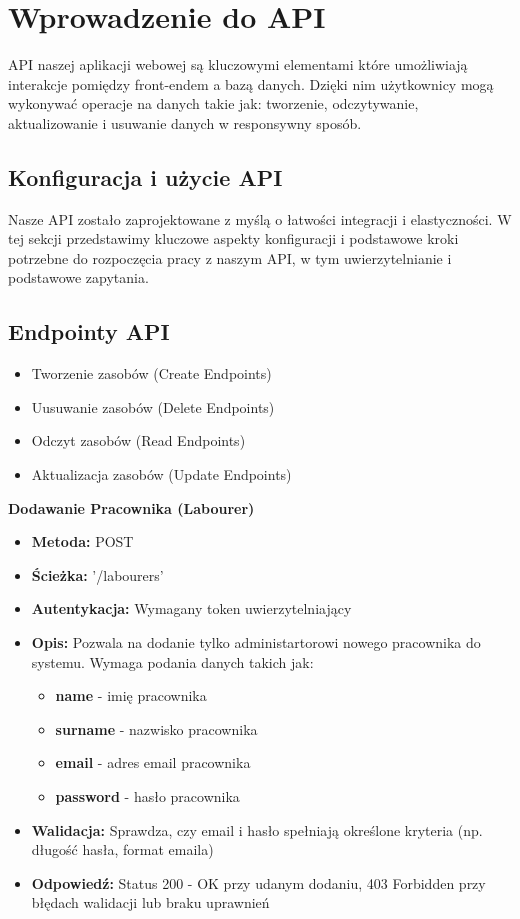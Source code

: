 \section{Wprowadzenie do API}
\noindent API naszej aplikacji webowej są kluczowymi elementami
które umożliwiają interakcje pomiędzy front-endem a bazą danych. Dzięki nim
użytkownicy mogą wykonywać operacje na danych
takie jak: tworzenie, odczytywanie, aktualizowanie i usuwanie danych w responsywny sposób.


\subsection{Konfiguracja i użycie API}
\noindent Nasze API zostało zaprojektowane z myślą o łatwości integracji i elastyczności. W tej sekcji przedstawimy kluczowe aspekty konfiguracji i podstawowe kroki potrzebne 
do rozpoczęcia pracy z naszym API, w tym uwierzytelnianie i podstawowe zapytania.

\subsection{Endpointy API}
\begin{itemize}
    \item Tworzenie zasobów (Create Endpoints)
    \item Uusuwanie zasobów (Delete Endpoints)
    \item Odczyt zasobów (Read Endpoints)
    \item Aktualizacja zasobów (Update Endpoints)
\end{itemize}

\textbf{\large{Dodawanie Pracownika (Labourer)}}
\begin{itemize}
    \item \textbf{Metoda:} POST
    \item \textbf{Ścieżka:} '/labourers'
    \item \textbf{Autentykacja:} Wymagany token uwierzytelniający
    \item \textbf{Opis:} Pozwala na dodanie tylko administartorowi nowego pracownika do systemu. Wymaga podania danych takich jak:
        \begin{itemize}
        \item \textbf{name} - imię pracownika
        \item \textbf{surname} - nazwisko pracownika
        \item \textbf{email} - adres email pracownika
        \item \textbf{password} - hasło pracownika
        \end{itemize}
    \item \textbf{Walidacja:} Sprawdza, czy email i hasło spełniają określone kryteria (np. długość hasła, format emaila)
    \item \textbf{Odpowiedź:} Status 200 - OK przy udanym dodaniu, 403 Forbidden przy błędach walidacji lub braku uprawnień
\end{itemize}

